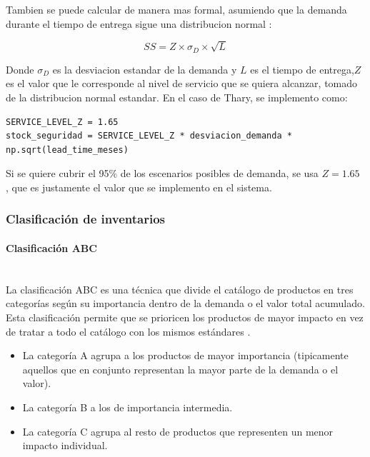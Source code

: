 Tambien se puede calcular de manera mas formal, asumiendo que la demanda durante el tiempo de entrega sigue una distribucion normal \cite{chopra2018supplychain}:

\begin{equation}
SS = Z \times \sigma_D \times \sqrt{L}
\end{equation}

Donde $\sigma_D$ es la desviacion estandar de la demanda y $L$ es el tiempo de entrega,$Z$ es el valor que le corresponde al nivel de servicio que se quiera alcanzar, tomado de la distribucion normal estandar.  En el caso de Thary, se implemento como: 

\label{lst:stock_seguridad_z}
\begin{verbatim}
SERVICE_LEVEL_Z = 1.65
stock_seguridad = SERVICE_LEVEL_Z * desviacion_demanda * np.sqrt(lead_time_meses)
\end{verbatim}

Si se quiere cubrir el 95\% de los escenarios posibles de demanda, se usa $Z = 1.65$ \cite{chopra2018supplychain}, que es justamente el valor que se implemento en el sistema.

\subsubsection{Clasificación de inventarios}                     %
    \paragraph{Clasificación ABC}\mbox{}\\
    La clasificación ABC es una técnica que divide el catálogo de productos en tres categorías según su importancia dentro de la demanda o el valor total acumulado. Esta clasificación permite que se prioricen los productos de mayor impacto en vez de tratar a todo el catálogo con los mismos estándares \cite{mahendrawathi2011abc}.
    
    \begin{itemize}
        \item La categoría A agrupa a los productos de mayor importancia (tipicamente aquellos que en conjunto representan la mayor parte de la demanda o el valor).
        \item La categoría B a los de importancia intermedia.
        \item La categoría C agrupa al resto de productos que representen un menor impacto individual.
    \end{itemize}

